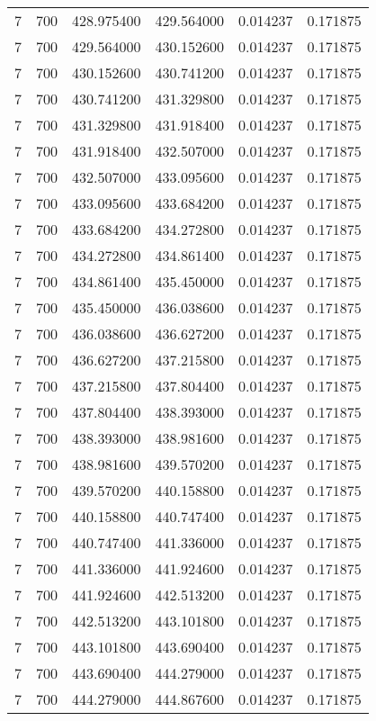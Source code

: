 \begin{longtable}{rrrrrr}
7 & 700 & 428.975400 & 429.564000 & 0.014237 & 0.171875 \\
7 & 700 & 429.564000 & 430.152600 & 0.014237 & 0.171875 \\
7 & 700 & 430.152600 & 430.741200 & 0.014237 & 0.171875 \\
7 & 700 & 430.741200 & 431.329800 & 0.014237 & 0.171875 \\
7 & 700 & 431.329800 & 431.918400 & 0.014237 & 0.171875 \\
7 & 700 & 431.918400 & 432.507000 & 0.014237 & 0.171875 \\
7 & 700 & 432.507000 & 433.095600 & 0.014237 & 0.171875 \\
7 & 700 & 433.095600 & 433.684200 & 0.014237 & 0.171875 \\
7 & 700 & 433.684200 & 434.272800 & 0.014237 & 0.171875 \\
7 & 700 & 434.272800 & 434.861400 & 0.014237 & 0.171875 \\
7 & 700 & 434.861400 & 435.450000 & 0.014237 & 0.171875 \\
7 & 700 & 435.450000 & 436.038600 & 0.014237 & 0.171875 \\
7 & 700 & 436.038600 & 436.627200 & 0.014237 & 0.171875 \\
7 & 700 & 436.627200 & 437.215800 & 0.014237 & 0.171875 \\
7 & 700 & 437.215800 & 437.804400 & 0.014237 & 0.171875 \\
7 & 700 & 437.804400 & 438.393000 & 0.014237 & 0.171875 \\
7 & 700 & 438.393000 & 438.981600 & 0.014237 & 0.171875 \\
7 & 700 & 438.981600 & 439.570200 & 0.014237 & 0.171875 \\
7 & 700 & 439.570200 & 440.158800 & 0.014237 & 0.171875 \\
7 & 700 & 440.158800 & 440.747400 & 0.014237 & 0.171875 \\
7 & 700 & 440.747400 & 441.336000 & 0.014237 & 0.171875 \\
7 & 700 & 441.336000 & 441.924600 & 0.014237 & 0.171875 \\
7 & 700 & 441.924600 & 442.513200 & 0.014237 & 0.171875 \\
7 & 700 & 442.513200 & 443.101800 & 0.014237 & 0.171875 \\
7 & 700 & 443.101800 & 443.690400 & 0.014237 & 0.171875 \\
7 & 700 & 443.690400 & 444.279000 & 0.014237 & 0.171875 \\
7 & 700 & 444.279000 & 444.867600 & 0.014237 & 0.171875 \\

\end{longtable}
